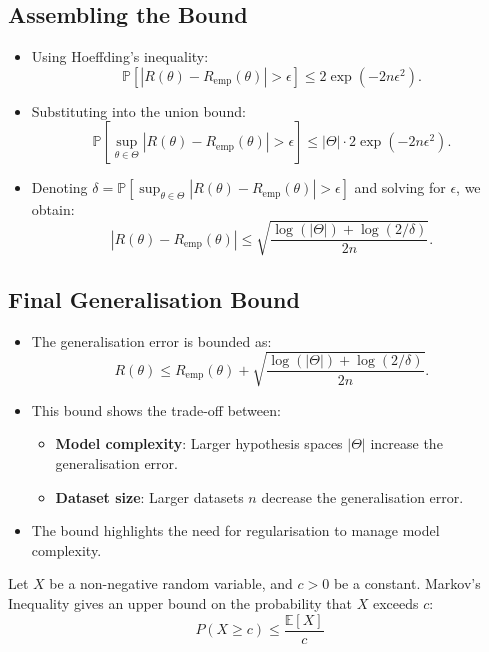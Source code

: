 \subsection{Assembling the Bound}

\begin{itemize}
    \item Using Hoeffding's inequality:
          \[
              \mathbb{P} \left[ |R(\theta) - R_{\text{emp}}(\theta)| > \epsilon \right] \leq 2 \exp(-2n\epsilon^2).
          \]
    \item Substituting into the union bound:
          \[
              \mathbb{P} \left[ \sup_{\theta \in \Theta} |R(\theta) - R_{\text{emp}}(\theta)| > \epsilon \right] \leq |\Theta| \cdot 2 \exp(-2n\epsilon^2).
          \]
    \item Denoting $\delta = \mathbb{P} \left[ \sup_{\theta \in \Theta} |R(\theta) - R_{\text{emp}}(\theta)| > \epsilon \right]$ and solving for $\epsilon$, we obtain:
          \[
              |R(\theta) - R_{\text{emp}}(\theta)| \leq \sqrt{\frac{\log(|\Theta|) + \log(2/\delta)}{2n}}.
          \]
\end{itemize}

\subsection{Final Generalisation Bound}

\begin{itemize}
    \item The generalisation error is bounded as:
          \[
              R(\theta) \leq R_{\text{emp}}(\theta) + \sqrt{\frac{\log(|\Theta|) + \log(2/\delta)}{2n}}.
          \]
    \item This bound shows the trade-off between:
          \begin{itemize}
              \item \textbf{Model complexity}: Larger hypothesis spaces $|\Theta|$ increase the generalisation error.
              \item \textbf{Dataset size}: Larger datasets $n$ decrease the generalisation error.
          \end{itemize}
    \item The bound highlights the need for regularisation to manage model complexity.
\end{itemize}



\begin{tcolorbox}[colback=cyan!10!white, colframe=cyan!70!black, title=Markov's Inequality]
    \raggedright Let \( X \) be a non-negative random variable, and \( c > 0 \) be a constant. Markov's Inequality gives an upper bound on the probability that \( X \) exceeds \( c \):
    \[
    P(X \geq c) \leq \frac{\mathbb{E}[X]}{c}
    \]
    \end{tcolorbox}
    

